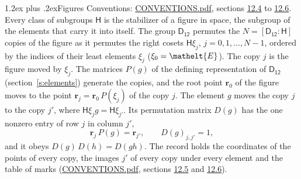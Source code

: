 \documentclass[10pt,a4paper]{article}
\makeatletter
\renewcommand\section{\@startsection{section}{1}{\z@}{-3ex plus -1ex minus -.2ex}%
  {1.2ex plus .2ex}{\normalfont\large\sffamily\bfseries\color{parttitle}}}
\numberwithin{equation}{section}
\newcommand{\eltfont}[1]{{\let\sigma\eltsigma\mathelt{#1}}}
\newcommand{\grp}[1]{\mathsf{#1}}
\newcommand{\cls}[1]{\eltfont{#1}}
\newcommand{\pointr}{\mathbf{r}}
\makeatother
\begin{document}
\section{Figures}\label{s:permutation}
Conventions: \href{../../CONVENTIONS.pdf}{CONVENTIONS.pdf}, sections \href{../../CONVENTIONS.pdf\#conv.12.4}{12.4} to \href{../../CONVENTIONS.pdf\#conv.12.6}{12.6}.
Every class of subgroups $\grp{H}$ is the stabilizer of a figure in space, the subgroup of the elements that carry it into itself. \label{n:local.orbit.size}\label{n:element.coset.least}\label{n:index.coset}The group $\grp{D_{12}}$ permutes the $N = [\grp{D_{12}} : \grp{H}]$ copies of the figure as it permutes the right cosets $\grp{H}\xi_j$, $j = 0, 1, \dots, N - 1$, ordered by the indices of their least elements $\xi_j$ ($\xi_0 = \cls{E}$). The copy $j$ is the figure moved by $\xi_j$. The matrices $P(g)$ of the defining representation of $\grp{D_{12}}$ (section~\ref{s:elements}) generate the copies, and the root point $\pointr_0$ of the figure moves to the point $\pointr_j = \pointr_0\, P(\xi_j)$ of the copy $j$. \label{n:local.coset.image}The element $g$ moves the copy $j$ to the copy $j'$, where $\grp{H}\xi_j g = \grp{H}\xi_{j'}$. \label{n:local.matrix.permutation}Its permutation matrix $D(g)$ has the one nonzero entry of row $j$ in column $j'$,
\begin{equation}\label{e:perm.matrix}\pointr_j\, P(g) = \pointr_{j'}, \qquad D(g)_{j,j'} = 1,\end{equation}
and it obeys $D(g)\, D(h) = D(gh)$. The record holds the coordinates of the points of every copy, the images $j'$ of every copy under every element and the table of marks (\href{../../CONVENTIONS.pdf}{CONVENTIONS.pdf}, sections \href{../../CONVENTIONS.pdf\#conv.12.5}{12.5} and \href{../../CONVENTIONS.pdf\#conv.12.6}{12.6}).
\end{document}
